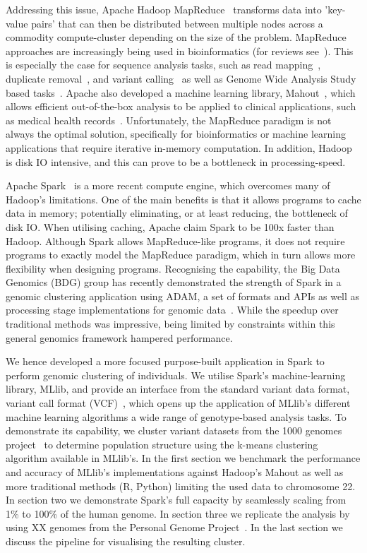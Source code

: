 \documentclass{bmcart}
\begin{document}
Addressing this issue, {\sc Apache Hadoop MapReduce}~\cite{Borthakur2007} transforms data into 'key-value pairs' that can then be distributed between multiple nodes across a commodity compute-cluster depending on the size of the problem. 
MapReduce approaches are increasingly being used in bioinformatics (for reviews see~\cite{Zou2013, Qiu2010,Taylor2010}). 
This is especially the case for sequence analysis tasks, such as read mapping~\cite{Schatz2009}, duplicate removal~\cite{Jourdren2012}, and variant calling~\cite{Langmead2009, McKenna2010} as well as Genome Wide Analysis Study based tasks~\cite{Huang2013, Guo2014}. 
Apache also developed a machine learning library, Mahout~\cite{Owen2011}, which allows efficient out-of-the-box analysis to be applied to clinical applications, such as medical health records~\cite{Ko2014}.
Unfortunately, the MapReduce paradigm is not always the optimal solution, specifically for bioinformatics or machine learning applications that require iterative in-memory computation. In addition, Hadoop is disk IO intensive, and this can prove to be a bottleneck in processing-speed.

{\sc Apache Spark}~\cite{Zaharia2011} is a more recent compute engine, which overcomes many of Hadoop's limitations. 
One of the main benefits is that it allows programs to cache data in memory; potentially eliminating, or at least reducing, the bottleneck of disk IO. 
When utilising caching, Apache claim {\sc Spark} to be 100x faster than Hadoop. 
Although {\sc Spark} allows MapReduce-like programs, it does not require programs to exactly model the MapReduce paradigm, which in turn allows more flexibility when designing programs. 
Recognising the capability, the Big Data Genomics (BDG) group has recently demonstrated the strength of {\sc Spark} in a genomic clustering application using ADAM, a set of formats and APIs as well as processing stage implementations for genomic data~\cite{Massie2013}. 
While the speedup over traditional methods was impressive, being limited by constraints within this general genomics framework hampered performance. 

We hence developed a more focused purpose-built application in {\sc Spark} to perform genomic clustering of individuals. 
We utilise {\sc Spark}'s machine-learning library, MLlib, and provide an interface from the standard variant data format, variant call format (VCF)~\cite{1KG2012}, which opens up the application of MLlib's different machine learning algorithms a wide range of genotype-based analysis tasks. 
To demonstrate its capability, we cluster variant datasets from the 1000 genomes project~\cite{1KG2012} to determine population structure using the k-means clustering algorithm available in MLlib's. 
In the first section we benchmark the performance and accuracy of MLlib's implementations against Hadoop's Mahout as well as more traditional methods (R, Python) limiting the used data to chromosome 22.
In section two we demonstrate {\sc Spark}'s full capacity by seamlessly scaling from 1\% to 100\% of the human genome.
In section three we replicate the analysis by using XX genomes from the Personal Genome Project~\cite{Lunshof2013}.
In the last section we discuss the pipeline for visualising the resulting cluster. 
\end{document}
